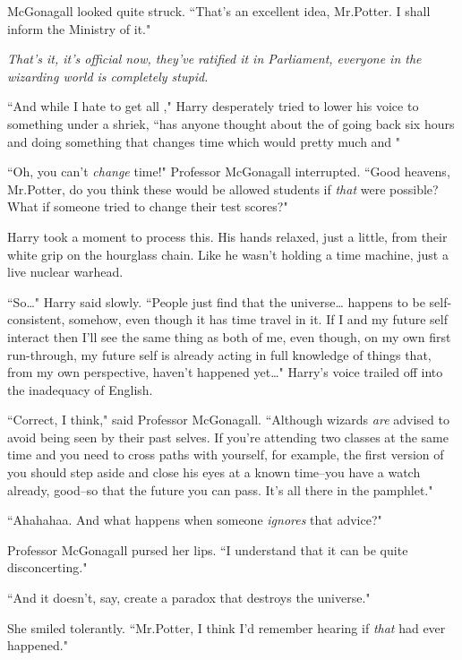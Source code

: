 McGonagall looked quite struck. ``That's an excellent idea, Mr.\?Potter. I shall inform the Ministry of it."

\emph{That's it, it's official now, they've ratified it in Parliament, everyone in the wizarding world is completely stupid.}

``And while I hate to get all ," Harry desperately tried to lower his voice to something under a shriek, ``has anyone thought about the  of going back six hours and doing something that changes time which would pretty much  and "

``Oh, you can't \emph{change} time!" Professor McGonagall interrupted. ``Good heavens, Mr.\?Potter, do you think these would be allowed students if \emph{that} were possible? What if someone tried to change their test scores?"

Harry took a moment to process this. His hands relaxed, just a little, from their white grip on the hourglass chain. Like he wasn't holding a time machine, just a live nuclear warhead.

``So{\ldots}" Harry said slowly. ``People just find that the universe{\ldots} happens to be self-consistent, somehow, even though it has time travel in it. If I and my future self interact then I'll see the same thing as both of me, even though, on my own first run-through, my future self is already acting in full knowledge of things that, from my own perspective, haven't happened yet{\ldots}" Harry's voice trailed off into the inadequacy of English.

``Correct, I think," said Professor McGonagall. ``Although wizards \emph{are} advised to avoid being seen by their past selves. If you're attending two classes at the same time and you need to cross paths with yourself, for example, the first version of you should step aside and close his eyes at a known time\---you have a watch already, good\---so that the future you can pass. It's all there in the pamphlet."

``Ahahahaa. And what happens when someone \emph{ignores} that advice?"

Professor McGonagall pursed her lips. ``I understand that it can be quite disconcerting."

``And it doesn't, say, create a paradox that destroys the universe."

She smiled tolerantly. ``Mr.\?Potter, I think I'd remember hearing if \emph{that} had ever happened."

